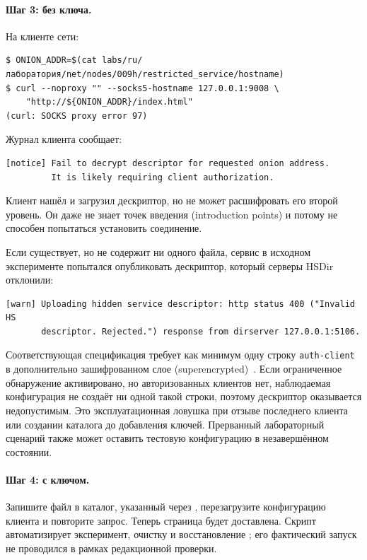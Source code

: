 \paragraph{Шаг 3: без ключа.} На клиенте сети:
\begin{lstlisting}[numbers=none]
$ ONION_ADDR=$(cat labs/ru/лаборатория/net/nodes/009h/restricted_service/hostname)
$ curl --noproxy "" --socks5-hostname 127.0.0.1:9008 \
    "http://${ONION_ADDR}/index.html"
(curl: SOCKS proxy error 97)
\end{lstlisting}
Журнал клиента сообщает:
\begin{lstlisting}[numbers=none]
[notice] Fail to decrypt descriptor for requested onion address.
         It is likely requiring client authorization.
\end{lstlisting}
Клиент нашёл и загрузил дескриптор, но не может расшифровать его второй уровень. Он даже не знает точек введения (introduction points) и потому не способен попытаться установить соединение.

\begin{attenzione}
Если  существует, но не содержит ни одного файла, сервис в исходном эксперименте попытался опубликовать дескриптор, который серверы HSDir отклонили:
\begin{lstlisting}[numbers=none]
[warn] Uploading hidden service descriptor: http status 400 ("Invalid HS
       descriptor. Rejected.") response from dirserver 127.0.0.1:5106.
\end{lstlisting}
Соответствующая спецификация требует как минимум одну строку \texttt{auth-client} в дополнительно зашифрованном слое (superencrypted)~. Если ограниченное обнаружение активировано, но авторизованных клиентов нет, наблюдаемая конфигурация не создаёт ни одной такой строки, поэтому дескриптор оказывается недопустимым. Это эксплуатационная ловушка при отзыве последнего клиента или создании каталога до добавления ключей. Прерванный лабораторный сценарий также может оставить тестовую конфигурацию в незавершённом состоянии.
\end{attenzione}

\paragraph{Шаг 4: с ключом.} Запишите файл  в каталог, указанный через , перезагрузите конфигурацию клиента и повторите запрос. Теперь страница будет доставлена. Скрипт  автоматизирует эксперимент, очистку и восстановление ; его фактический запуск не проводился в рамках редакционной проверки.

